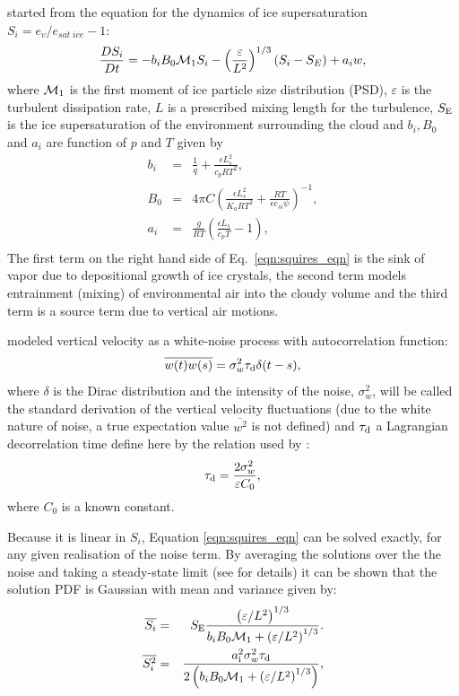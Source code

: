 \documentclass{UMDP_article}
\begin{document}
\cite{fhfk14} started from the equation for the dynamics of
ice supersaturation $S_i=e_v/e_{sat\;ice}-1$:
\begin{equation}\label{eqn:squires_eqn}
 \frac{D S_i}{D t} = -b_i B_0 {\cal M}_1 S_i
   -\left(\frac{\varepsilon}{L^2}\right)^{1/3}(S_i-S_E) + a_i w,
\end{equation}
where ${\cal M}_1$ is the first moment of ice particle size distribution (PSD),
$\varepsilon$ is the turbulent dissipation rate, $L$ is a prescribed mixing length
for the turbulence, $S_{\rm E}$ is the ice supersaturation of the
environment surrounding the cloud and $b_i,B_0$ and $a_i$ are function of $p$ and $T$ given by
\begin{eqnarray}
 b_i &=& \frac{1}{q} + \frac{\epsilon L_s^2}{c_p R T^2}, \\
 B_0 &=& 4\pi C \left( \frac{\epsilon L_s^2}{K_a R T^2} + \frac{R T}{\epsilon e_{si} \psi} \right)^{-1}, \\
 a_i &=& \frac{g}{R T}\left( \frac{\epsilon L_s}{c_p T} - 1 \right), \\
\end{eqnarray}
The first term on the right hand side of Eq.~\ref{eqn:squires_eqn} is
the sink of vapor due to depositional growth of ice crystals, the second
term models entrainment (mixing) of environmental air into the cloudy
volume and the third term is a source term due to vertical air motions.

\cite{fhfk14} modeled vertical velocity as a white-noise process
with autocorrelation function:
\begin{equation}
 \overline{w(t)w(s)} = \sigma_w^2 \tau_{\rm d} \delta(t-s),
\end{equation}
where $\delta$ is the Dirac distribution and the intensity of the
noise, $\sigma_w^2$, will be called the
standard derivation of the vertical velocity fluctuations (due to the white nature of
noise, a true expectation value $\overline{w^2}$ is not defined) and $\tau_{\rm d}$
a Lagrangian decorrelation time define here by the relation used by \cite{rodean1997}:
\begin{equation}
 \tau_{\rm d} = \frac{2\sigma_w^2}{\varepsilon C_0},
\label{eqn:taud}
\end{equation} 
where $C_0$ is a known constant.

Because it is linear in $S_i$, Equation \ref{eqn:squires_eqn} can be solved exactly,
for any given realisation of the noise term. By averaging the solutions over the the noise
and taking a steady-state limit (see \cite{fhfk14} for details) it can be shown
that the solution PDF is Gaussian with mean and variance given by:
\begin{eqnarray}
 \overline{S_i} &=& 
  S_{\rm E}\frac{ \left(\varepsilon/L^2\right)^{1/3}  }{ b_i B_0 {\cal M}_1  + \left(\varepsilon/L^2\right)^{1/3} }.
  \label{eqn:si_avg} \\
 \overline{S_i^2} &=&
  \frac{a^2_{\rm i} \sigma^2_w \tau_{\rm d}}{ 2\left(b_i B_0 {\cal M}_1  + \left(\varepsilon/L^2\right)^{1/3}\right)},
 \label{eqn:si_var}
\end{eqnarray}
\end{document}
